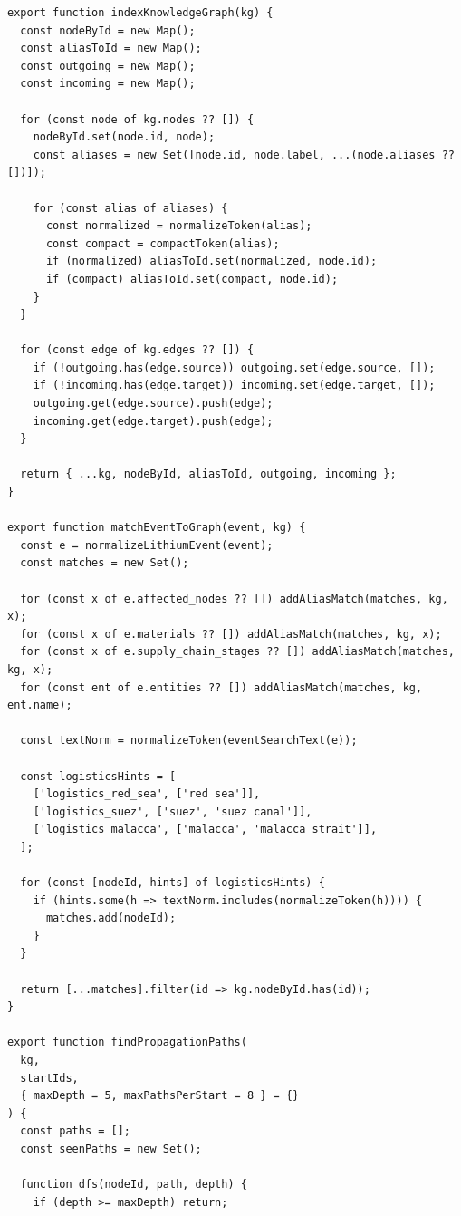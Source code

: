 \documentclass[12pt,a4paper]{article}
\begin{document}
\begin{lstlisting}[style=projectcode,caption={事件到产业链图谱的匹配与传播路径搜索}]
export function indexKnowledgeGraph(kg) {
  const nodeById = new Map();
  const aliasToId = new Map();
  const outgoing = new Map();
  const incoming = new Map();

  for (const node of kg.nodes ?? []) {
    nodeById.set(node.id, node);
    const aliases = new Set([node.id, node.label, ...(node.aliases ?? [])]);

    for (const alias of aliases) {
      const normalized = normalizeToken(alias);
      const compact = compactToken(alias);
      if (normalized) aliasToId.set(normalized, node.id);
      if (compact) aliasToId.set(compact, node.id);
    }
  }

  for (const edge of kg.edges ?? []) {
    if (!outgoing.has(edge.source)) outgoing.set(edge.source, []);
    if (!incoming.has(edge.target)) incoming.set(edge.target, []);
    outgoing.get(edge.source).push(edge);
    incoming.get(edge.target).push(edge);
  }

  return { ...kg, nodeById, aliasToId, outgoing, incoming };
}

export function matchEventToGraph(event, kg) {
  const e = normalizeLithiumEvent(event);
  const matches = new Set();

  for (const x of e.affected_nodes ?? []) addAliasMatch(matches, kg, x);
  for (const x of e.materials ?? []) addAliasMatch(matches, kg, x);
  for (const x of e.supply_chain_stages ?? []) addAliasMatch(matches, kg, x);
  for (const ent of e.entities ?? []) addAliasMatch(matches, kg, ent.name);

  const textNorm = normalizeToken(eventSearchText(e));

  const logisticsHints = [
    ['logistics_red_sea', ['red sea']],
    ['logistics_suez', ['suez', 'suez canal']],
    ['logistics_malacca', ['malacca', 'malacca strait']],
  ];

  for (const [nodeId, hints] of logisticsHints) {
    if (hints.some(h => textNorm.includes(normalizeToken(h)))) {
      matches.add(nodeId);
    }
  }

  return [...matches].filter(id => kg.nodeById.has(id));
}

export function findPropagationPaths(
  kg,
  startIds,
  { maxDepth = 5, maxPathsPerStart = 8 } = {}
) {
  const paths = [];
  const seenPaths = new Set();

  function dfs(nodeId, path, depth) {
    if (depth >= maxDepth) return;


\end{lstlisting}
\end{document}
